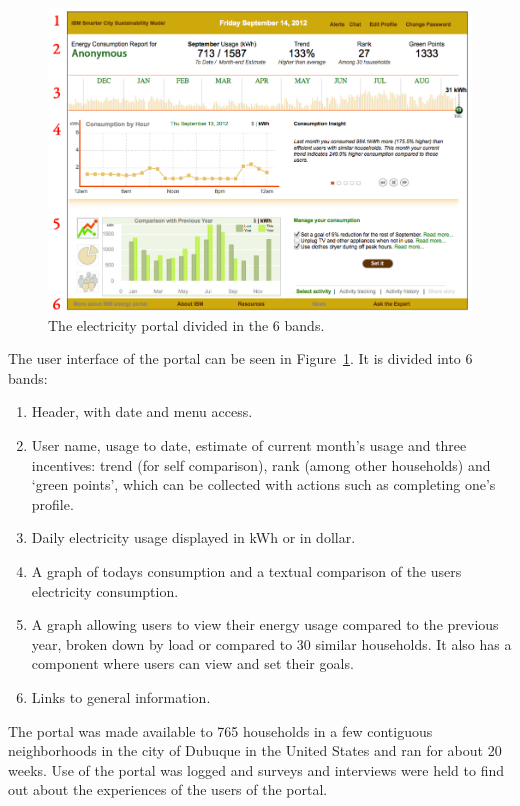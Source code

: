 \documentclass[journal]{vgtc}                %
\begin{document}
\begin{figure}[h]
	\centering
	\includegraphics[scale=0.26]{./electricity_portal.png}
	\caption{The electricity portal divided in the 6 bands. \cite{erickson2013dubuque}}
	\label{fig:electricityportal}
\end{figure}

The user interface of the portal can be seen in Figure~\ref{fig:electricityportal}. It is divided into 6 bands:
\begin{enumerate}
\item Header, with date and menu access.
\item User name, usage to date, estimate of current month's usage and three incentives: trend (for self comparison), rank (among other households) and `green points', which can be collected with actions such as completing one's profile.
\item Daily electricity usage displayed in kWh or in dollar.
\item A graph of todays consumption and a textual comparison of the users electricity consumption.
\item A graph allowing users to view their energy usage compared to the previous year, broken down by load or compared to 30 similar households. It also has a component where users can view and set their goals.
\item Links to general information.
\end{enumerate}

The portal was made available to 765 households in a few contiguous neighborhoods in the city of Dubuque in the United States and ran for about 20 weeks. Use of the portal was logged and surveys and interviews were held to find out about the experiences of the users of the portal.
\end{document}
